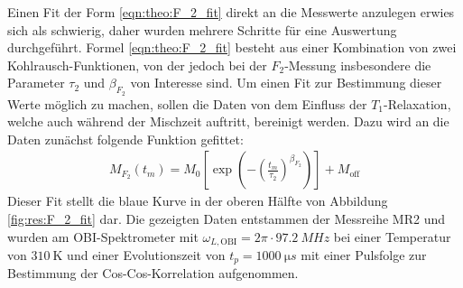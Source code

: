 Einen Fit der Form \eqref{eqn:theo:F_2_fit} direkt an die Messwerte anzulegen erwies sich als schwierig, daher wurden mehrere Schritte für eine Auswertung durchgeführt. Formel \eqref{eqn:theo:F_2_fit} besteht aus einer Kombination von zwei Kohlrausch-Funktionen, von der jedoch bei der $F_2$-Messung insbesondere die Parameter $\tau_2$ und $\beta_{F_2}$ von Interesse sind. Um einen Fit zur Bestimmung dieser Werte möglich zu machen, sollen die Daten von dem Einfluss der $T_1$-Relaxation, welche auch während der Mischzeit auftritt, bereinigt werden. Dazu wird an die Daten zunächst folgende Funktion gefittet:
\begin{align}
	M_{F_2} (t_m) = M_0 \left[ \exp{ \left(- { \left( \frac{t_m}{\tau_2} \right) }^{\beta_{F_2}} \right)} \right] + M_\text{off} \label{eqn:res:F_2_fit}
\end{align}
Dieser Fit stellt die blaue Kurve in der oberen Hälfte von Abbildung \ref{fig:res:F_2_fit} dar. Die gezeigten Daten entstammen der Messreihe MR2 und wurden am OBI-Spektrometer mit $\omega_{L, \text{OBI}} = 2\pi \cdot \SI{97.2}{MHz}$ bei einer Temperatur von $\SI{310}{\kelvin}$ und einer Evolutionszeit von $t_p = \SI{1000}{\micro s}$ mit einer Pulsfolge zur Bestimmung der Cos-Cos-Korrelation aufgenommen.
